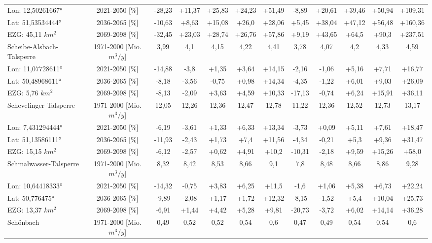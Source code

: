 \begin{longtable}{@{\extracolsep{\fill}}lc|ccccc||ccccc}
\cline{2-12} 
Lon: 12,50261667° & 2021-2050 [\%]  & -28,23 & +11,37 & +25,83 & +24,23 & +51,49 & -8,89 & +20,61 & +39,46 & +50,94 & +109,31\\ 
Lat: 51,53534444° & 2036-2065 [\%]  & -10,63 & +8,63 & +15,08 & +26,0 & +28,06 & +5,45 & +38,04 & +47,12 & +56,48 & +160,36\\ 
EZG: 45,11 $km^2$ & 2069-2098 [\%]  & -32,45 & +23,03 & +28,74 & +26,76 & +57,86 & +9,19 & +43,65 & +64,5 & +90,3 & +237,51\\ 
\hline 
Scheibe-Alsbach-Talsperre & 1971-2000 [Mio. $m^3/y$]  & 3,99 & 4,1 & 4,15 & 4,22 & 4,41 & 3,78 & 4,07 & 4,2 & 4,33 & 4,59\\ 
\cline{2-12} 
Lon: 11,07728611° & 2021-2050 [\%]  & -14,88 & -3,8 & +1,35 & +3,64 & +14,15 & -2,16 & -1,06 & +5,16 & +7,71 & +16,77\\ 
Lat: 50,48968611° & 2036-2065 [\%]  & -8,18 & -3,56 & -0,75 & +0,98 & +14,34 & -4,35 & -1,22 & +6,01 & +9,03 & +26,09\\ 
EZG: 5,76 $km^2$ & 2069-2098 [\%]  & -8,13 & -2,09 & +3,63 & +4,59 & +10,33 & -17,13 & -0,74 & +6,24 & +15,91 & +36,11\\ 
\hline 
Schevelinger-Talsperre & 1971-2000 [Mio. $m^3/y$]  & 12,05 & 12,26 & 12,36 & 12,47 & 12,78 & 11,22 & 12,36 & 12,52 & 12,73 & 13,17\\ 
\cline{2-12} 
Lon: 7,431294444° & 2021-2050 [\%]  & -6,19 & -3,61 & +1,33 & +6,33 & +13,34 & -3,73 & +0,09 & +5,11 & +7,61 & +18,47\\ 
Lat: 51,13586111° & 2036-2065 [\%]  & -11,93 & -2,43 & +1,73 & +7,4 & +11,56 & -4,34 & -0,21 & +5,3 & +9,36 & +31,47\\ 
EZG: 15,15 $km^2$ & 2069-2098 [\%]  & -6,12 & -2,57 & +0,62 & +4,91 & +10,2 & -10,31 & -2,18 & +9,59 & +15,26 & +58,0\\ 
\hline 
Schmalwasser-Talsperre & 1971-2000 [Mio. $m^3/y$]  & 8,32 & 8,42 & 8,53 & 8,66 & 9,1 & 7,8 & 8,48 & 8,66 & 8,86 & 9,28\\ 
\cline{2-12} 
Lon: 10,64418333° & 2021-2050 [\%]  & -14,32 & -0,75 & +3,83 & +6,25 & +11,5 & -1,6 & +1,06 & +5,38 & +6,73 & +22,24\\ 
Lat: 50,776475° & 2036-2065 [\%]  & -9,89 & -2,08 & +1,17 & +1,72 & +12,32 & -8,15 & -1,52 & +5,4 & +10,04 & +25,73\\ 
EZG: 13,37 $km^2$ & 2069-2098 [\%]  & -6,91 & +1,44 & +4,42 & +5,28 & +9,81 & -20,73 & -3,72 & +6,02 & +14,14 & +36,28\\ 
\hline 
Schönbach & 1971-2000 [Mio. $m^3/y$]  & 0,49 & 0,52 & 0,52 & 0,54 & 0,6 & 0,47 & 0,49 & 0,54 & 0,54 & 0,6\\ 

\end{longtable}
